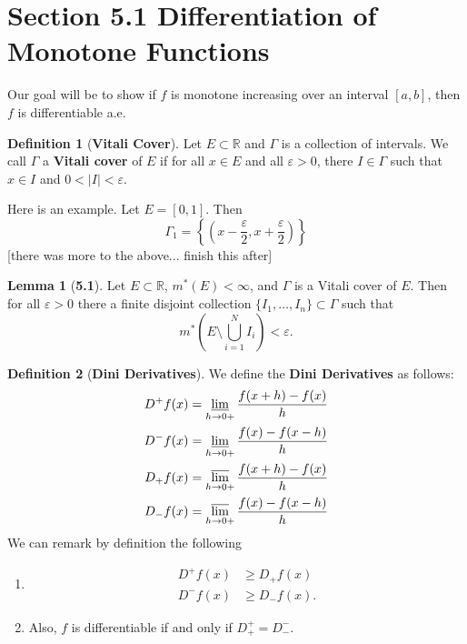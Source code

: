 \documentclass[12pt]{article}
\newcommand{\R}{\mathbb{R}}
\renewcommand{\epsilon}{\varepsilon}
\theoremstyle{definition}
\newtheorem*{definition}{Definition}
\newtheorem*{lemma}{Lemma}
\begin{document}
\section*{Section 5.1 Differentiation of Monotone Functions}

Our goal will be to show if \( f \) is monotone increasing over an interval \( [a,b] \), then \( f \) is 
differentiable a.e.

\begin{definition}[\textbf{Vitali Cover}]

    Let \( E \subset \R \) and \( \Gamma \) is a collection of intervals. We call \( \Gamma \) a \textbf{Vitali cover}
    of \( E \) if for all \( x \in E \) and all \( \epsilon > 0 \), there \( I \in \Gamma \) such that \( x \in I \) and 
    \( 0 < |I| < \epsilon \).
    
\end{definition}

Here is an example. Let \( E = [0,1 ] \). Then
    \[
        \Gamma_1 = \left\{ \left( x - \frac{\epsilon}{2}, x + \frac{\epsilon}{2}\right) \right\}  
    \]
[there was more to the above... finish this after]

\begin{lemma}[\textbf{5.1}]

    Let \( E \subset \R \), \( m^{*}(E) < \infty \), and \( \Gamma \) is a Vitali cover of \( E \). Then for all \( \epsilon > 0 \)
    there a finite disjoint collection \( \{ I_1, \ldots, I_n\} \subset \Gamma \) such that 
        \[  
            m^{*} \left( E \setminus \bigcup_{i=1}^{N} I_i \right) < \epsilon.
        \]
    
\end{lemma}

\begin{definition}[\textbf{Dini Derivatives}]

    We define the \textbf{Dini Derivatives} as follows:
        \begin{align*}
            D^{+} f(x) &= \varliminf_{h \to 0+} \frac{f(x+h) - f(x)}{h} \\
            D^{-} f(x) &= \varliminf_{h \to 0+} \frac{f(x) - f(x - h)}{h} \\
            D_{+} f(x) &= \varlimsup_{h \to 0+} \frac{f(x+h) - f(x)}{h} \\
            D_{-} f(x) &= \varlimsup_{h \to 0+} \frac{f(x) - f(x - h)}{h}
        \end{align*}
We can remark by definition the following 
\begin{enumerate}
    \item \begin{align*}
        D^{+} f(x)  &\geq D_{+} f(x) \\
        D^{-} f(x) &\geq D_{-} f(x).
    \end{align*}
    \item         
    Also, \( f \) is differentiable if and only if \( D^{+}_{+} = D_{-}^{-} \).
\end{enumerate}

    
\end{definition}
\end{document}
